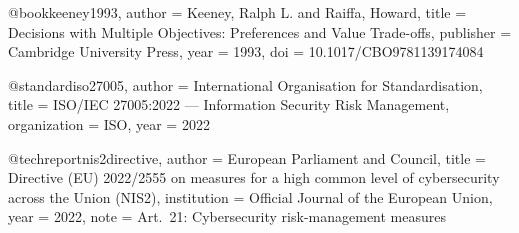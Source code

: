 
@book{keeney1993,
  author    = {Keeney, Ralph L. and Raiffa, Howard},
  title     = {Decisions with Multiple Objectives: Preferences and
               Value Trade-offs},
  publisher = {Cambridge University Press},
  year      = {1993},
  doi       = {10.1017/CBO9781139174084}
}

@standard{iso27005,
  author       = {{International Organisation for Standardisation}},
  title        = {{ISO/IEC 27005:2022} --- Information Security Risk
                  Management},
  organization = {ISO},
  year         = {2022}
}

@techreport{nis2directive,
  author      = {{European Parliament and Council}},
  title       = {Directive (EU) 2022/2555 on measures for a high common
                 level of cybersecurity across the Union ({NIS2})},
  institution = {Official Journal of the European Union},
  year        = {2022},
  note        = {Art.~21: Cybersecurity risk-management measures}
}





